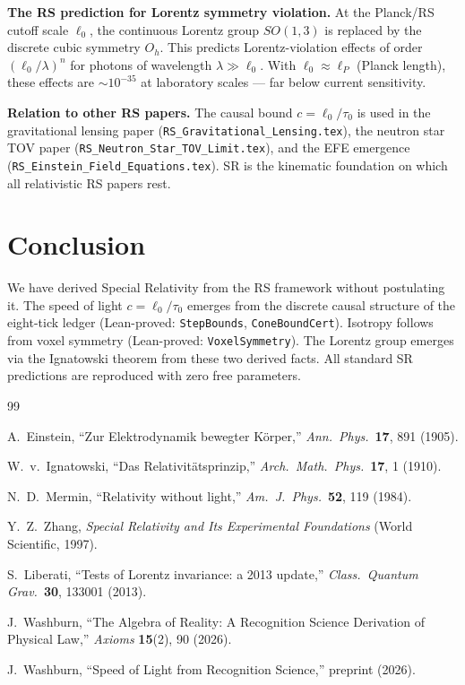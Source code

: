 \documentclass[12pt,a4paper]{article}
\theoremstyle{definition}
\theoremstyle{remark}
\begin{document}
\textbf{The RS prediction for Lorentz symmetry violation.}
At the Planck/RS cutoff scale $\ell_0$, the continuous Lorentz group
$SO(1,3)$ is replaced by the discrete cubic symmetry $O_h$.  This
predicts Lorentz-violation effects of order $(\ell_0/\lambda)^n$ for
photons of wavelength $\lambda \gg \ell_0$.  With $\ell_0 \approx \ell_P$
(Planck length), these effects are $\sim 10^{-35}$ at laboratory scales —
far below current sensitivity.

\textbf{Relation to other RS papers.}
The causal bound $c = \ell_0/\tau_0$ is used in the gravitational
lensing paper (\texttt{RS\_Gravitational\_Lensing.tex}), the neutron
star TOV paper (\texttt{RS\_Neutron\_Star\_TOV\_Limit.tex}), and the
EFE emergence (\texttt{RS\_Einstein\_Field\_Equations.tex}).  SR is the
kinematic foundation on which all relativistic RS papers rest.

\section{Conclusion}
\label{sec:conclusion}

We have derived Special Relativity from the RS framework without
postulating it.  The speed of light $c = \ell_0/\tau_0$ emerges from the
discrete causal structure of the eight-tick ledger (Lean-proved:
\texttt{StepBounds}, \texttt{ConeBoundCert}).  Isotropy follows from
voxel symmetry (Lean-proved: \texttt{VoxelSymmetry}).  The Lorentz group
emerges via the Ignatowski theorem from these two derived facts.  All
standard SR predictions are reproduced with zero free parameters.

\begin{thebibliography}{99}

A.~Einstein, ``Zur Elektrodynamik bewegter K\"{o}rper,''
\textit{Ann.\ Phys.}\ \textbf{17}, 891 (1905).

W.~v.~Ignatowski, ``Das Relativit\"{a}tsprinzip,''
\textit{Arch.\ Math.\ Phys.}\ \textbf{17}, 1 (1910).

N.~D.~Mermin, ``Relativity without light,''
\textit{Am.\ J.\ Phys.}\ \textbf{52}, 119 (1984).

Y.~Z.~Zhang, \textit{Special Relativity and Its Experimental
Foundations} (World Scientific, 1997).

S.~Liberati, ``Tests of Lorentz invariance: a 2013 update,''
\textit{Class.\ Quantum Grav.}\ \textbf{30}, 133001 (2013).

J.~Washburn, ``The Algebra of Reality: A Recognition Science Derivation
of Physical Law,'' \textit{Axioms} \textbf{15}(2), 90 (2026).

J.~Washburn, ``Speed of Light from Recognition Science,'' preprint (2026).

\end{thebibliography}
\end{document}
